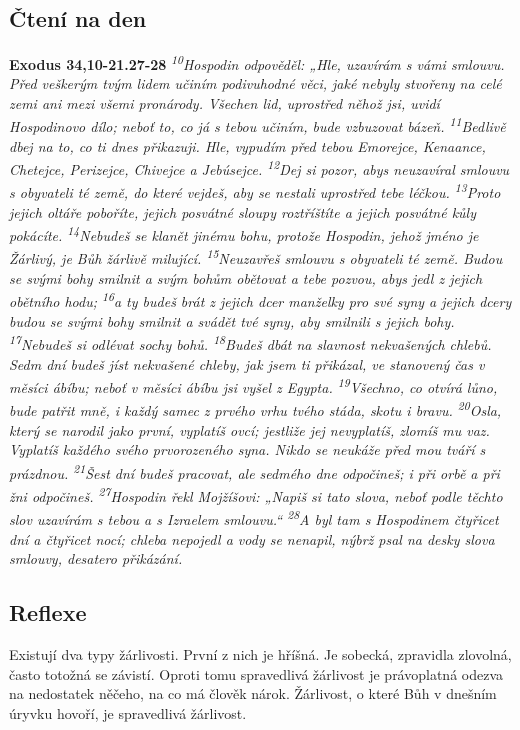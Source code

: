 \documentclass[11pt]{article}
\begin{document}
\subsection*{Čtení na den}
\textbf{Exodus 34,10-21.27-28}
\newline
\textit{
\textsuperscript{10}Hospodin odpověděl: „Hle, uzavírám s vámi smlouvu. Před veškerým tvým lidem učiním podivuhodné věci, jaké nebyly stvořeny na celé zemi ani mezi všemi pronárody. Všechen lid, uprostřed něhož jsi, uvidí Hospodinovo dílo; neboť to, co já s tebou učiním, bude vzbuzovat bázeň.
\textsuperscript{11}Bedlivě dbej na to, co ti dnes přikazuji. Hle, vypudím před tebou Emorejce, Kenaance, Chetejce, Perizejce, Chivejce a Jebúsejce.
\textsuperscript{12}Dej si pozor, abys neuzavíral smlouvu s obyvateli té země, do které vejdeš, aby se nestali uprostřed tebe léčkou.
\textsuperscript{13}Proto jejich oltáře poboříte, jejich posvátné sloupy roztříštíte a jejich posvátné kůly pokácíte.
\textsuperscript{14}Nebudeš se klanět jinému bohu, protože Hospodin, jehož jméno je Žárlivý, je Bůh žárlivě milující.
\textsuperscript{15}Neuzavřeš smlouvu s obyvateli té země. Budou se svými bohy smilnit a svým bohům obětovat a tebe pozvou, abys jedl z jejich obětního hodu;
\textsuperscript{16}a ty budeš brát z jejich dcer manželky pro své syny a jejich dcery budou se svými bohy smilnit a svádět tvé syny, aby smilnili s jejich bohy.
\textsuperscript{17}Nebudeš si odlévat sochy bohů.
\textsuperscript{18}Budeš dbát na slavnost nekvašených chlebů. Sedm dní budeš jíst nekvašené chleby, jak jsem ti přikázal, ve stanovený čas v měsíci ábíbu; neboť v měsíci ábíbu jsi vyšel z Egypta.
\textsuperscript{19}Všechno, co otvírá lůno, bude patřit mně, i každý samec z prvého vrhu tvého stáda, skotu i bravu.
\textsuperscript{20}Osla, který se narodil jako první, vyplatíš ovcí; jestliže jej nevyplatíš, zlomíš mu vaz. Vyplatíš každého svého prvorozeného syna. Nikdo se neukáže před mou tváří s prázdnou.
\textsuperscript{21}Šest dní budeš pracovat, ale sedmého dne odpočineš; i při orbě a při žni odpočineš.
\newline
\newline
\textsuperscript{27}Hospodin řekl Mojžíšovi: „Napiš si tato slova, neboť podle těchto slov uzavírám s tebou a s Izraelem smlouvu.“
\textsuperscript{28}A byl tam s Hospodinem čtyřicet dní a čtyřicet nocí; chleba nepojedl a vody se nenapil, nýbrž psal na desky slova smlouvy, desatero přikázání.
}

\subsection*{Reflexe}
Existují dva typy žárlivosti. První z nich je hříšná. Je sobecká, zpravidla zlovolná, často totožná se závistí. Oproti tomu spravedlivá
žárlivost je právoplatná odezva na nedostatek něčeho, na co má člověk nárok. Žárlivost, o které Bůh v dnešním úryvku hovoří, je
spravedlivá žárlivost.
\end{document}

